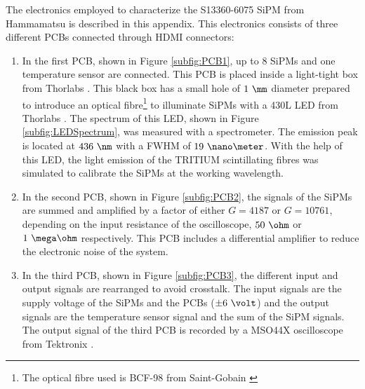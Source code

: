 The electronics employed to characterize the S13360-6075 SiPM from Hammamatsu is described in this appendix. This electronics consists of three different PCBs connected through HDMI connectors:

\begin{enumerate}
\item{} In the first PCB, shown in Figure \ref{subfig:PCB1}, up to 8 SiPMs and one temperature sensor are connected. This PCB is placed inside a light-tight box from Thorlabs \cite{ThorlabsCompany}. This black box has a small hole of $1~\mm$ diameter prepared to introduce an optical fibre\footnote{The optical fibre used is BCF-98 from Saint-Gobain \cite{OpticalFibers}} to illuminate SiPMs with a 430L LED from Thorlabs \cite{LEDThorlabs}. The spectrum of this LED, shown in Figure \ref{subfig:LEDSpectrum}, was measured with a spectrometer. The emission peak is located at $436~\nm$ with a FWHM of $19~\nano\meter$. With the help of this LED, the light emission of the TRITIUM scintillating fibres was simulated to calibrate the SiPMs at the working wavelength. 

\item{} In the second PCB, shown in Figure \ref{subfig:PCB2}, the signals of the SiPMs are summed and amplified by a factor of either $G=4187$ or $G=10761$, depending on the input resistance of the oscilloscope, $50~\ohm$ or $1~\mega\ohm$ respectively. This PCB includes a differential amplifier to reduce the electronic noise of the system.

\item{} In the third PCB, shown in Figure \ref{subfig:PCB3}, the different input and output signals are rearranged to avoid crosstalk. The input signals are the supply voltage of the SiPMs and the PCBs ($\pm 6~\volt$) and the output signals are the temperature sensor signal and the sum of the SiPM signals. The output signal of the third PCB is recorded by a MSO44X oscilloscope from Tektronix \cite{Oscilloscope}.

\end{enumerate}

